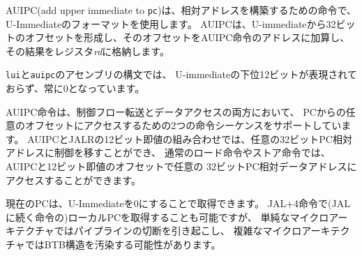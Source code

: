 AUIPC(add upper immediate to {\tt pc})は、相対アドレスを構築するための命令で、
U-Immediateのフォーマットを使用します。
AUIPCは、U-immediateから32ビットのオフセットを形成し、そのオフセットをAUIPC命令のアドレスに加算し、
その結果をレジスタ{\em rd}に格納します。

\begin{commentary}
\begin{comment}
The assembly syntax for {\tt lui} and {\tt auipc} does not represent the lower
12 bits of the U-immediate, which are always zero.
\end{comment}

{\tt lui}と{\tt auipc}のアセンブリの構文では、
U-immediateの下位12ビットが表現されておらず、常に0となっています。

\begin{comment}
The AUIPC instruction supports two-instruction sequences to access
arbitrary offsets from the PC for both control-flow transfers and data
accesses.  The combination of an AUIPC and the 12-bit immediate in a
JALR can transfer control to any 32-bit PC-relative address, while an
AUIPC plus the 12-bit immediate offset in regular load or store
instructions can access any 32-bit PC-relative data address.
\end{comment}

AUIPC命令は、制御フロー転送とデータアクセスの両方において、
PCからの任意のオフセットにアクセスするための2つの命令シーケンスをサポートしています。 
AUIPCとJALRの12ビット即値の組み合わせでは、任意の32ビットPC相対アドレスに制御を移すことができ、
通常のロード命令やストア命令では、AUIPCと12ビット即値のオフセットで任意の
32ビットPC相対データアドレスにアクセスすることができます。

\begin{comment}
The current PC can be obtained by setting the U-immediate to 0.
Although a JAL +4 instruction could also be used to obtain the local
PC (of the instruction following the JAL), it might cause pipeline
breaks in simpler microarchitectures or pollute BTB structures in more
complex microarchitectures.
\end{comment}

現在のPCは、U-Immediateを0にすることで取得できます。 
JAL+4命令で(JALに続く命令の)ローカルPCを取得することも可能ですが、
単純なマイクロアーキテクチャではパイプラインの切断を引き起こし、
複雑なマイクロアーキテクチャではBTB構造を汚染する可能性があります。

\end{commentary}

